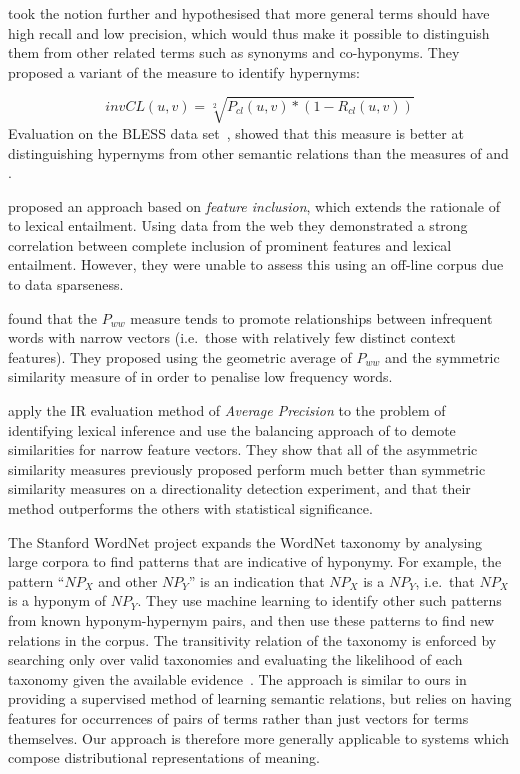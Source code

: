 \documentclass[11pt]{article}
\begin{document}
 took the notion further and hypothesised that more general terms should have high recall and low precision, which would thus make it possible to distinguish them from other related terms such as synonyms and co-hyponyms.  They proposed a variant of the  measure to identify hypernyms:

\[
invCL(u,v) = \sqrt[2]{P_{cl}(u,v)*(1-R_{cl}(u,v))}
\]
Evaluation on the BLESS data set~\cite{Baroni2011}, showed that this measure is  better at distinguishing hypernyms from other semantic relations than the measures of  and .

 proposed an approach based on \emph{feature inclusion}, which extends the rationale of~ to lexical entailment. Using data from the web they demonstrated a strong correlation between complete inclusion of prominent features and lexical entailment. However, they were unable to assess this using an off-line corpus due to data sparseness.

 found that the $P_{ww}$ measure tends to promote relationships between infrequent words with narrow vectors (i.e.~those with relatively few distinct context features).  They proposed using the geometric average of $P_{ww}$ and the symmetric similarity measure of  in order to penalise low frequency words.   

  apply the IR evaluation method of \emph{Average Precision} to the problem of identifying lexical inference and use the balancing approach of  to demote similarities for narrow feature vectors.  They show that all of the asymmetric similarity measures previously proposed perform much better than symmetric similarity measures on a directionality detection experiment, and that their method outperforms the others with statistical significance.

The Stanford WordNet project \cite{Snow:04} expands the WordNet
taxonomy by analysing large corpora to find patterns that are
indicative of hyponymy. For example, the pattern ``$\mathit{NP}_X$ and
other $\mathit{NP}_Y$'' is an indication that $\mathit{NP}_X$ is a
$\mathit{NP}_Y$, i.e.~that $\mathit{NP}_X$ is a hyponym of
$\mathit{NP}_Y$. They use machine learning to identify other such
patterns from known hyponym-hypernym pairs, and then use these
patterns to find new relations in the corpus. The
transitivity relation of the taxonomy is enforced by searching only over valid
taxonomies and evaluating the likelihood of each taxonomy given the
available evidence~\cite{Snow:06}. The approach is similar to
ours in providing a supervised method of learning semantic relations, but relies on having features for occurrences of pairs of terms rather than just vectors for terms themselves. Our approach is therefore more generally applicable to systems which compose distributional
representations of meaning.
\end{document}
